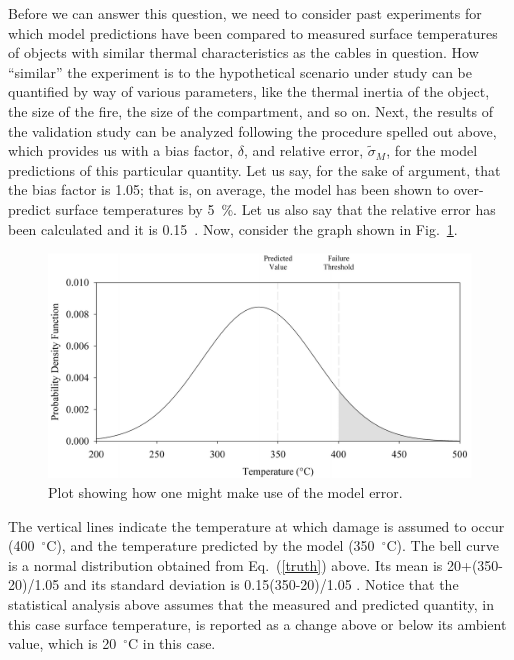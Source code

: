 Before we can answer this question, we need to consider past experiments for which model predictions have been compared to measured surface temperatures of objects
with similar thermal characteristics as the cables in question. How ``similar'' the experiment is to the hypothetical scenario under study can be quantified by way of
various parameters, like the thermal inertia of the object, the size of the fire, the size of the compartment, and so on. Next, the results of the validation study can be
analyzed following the procedure spelled out above, which provides us with a bias factor, $\delta$, and relative error, $\tilde{\sigma}_M$, for the model
predictions of this particular quantity. Let us say, for the sake of argument, that the bias factor is 1.05; that is, on average, the model has been shown to over-predict
surface temperatures by 5~\%. Let us also say that the relative error has been calculated and it is 0.15~.
Now, consider the graph shown in Fig.~\ref{bell_curve}.
\begin{figure}[ht]
\begin{center}
\includegraphics[width=5.in]{FIGURES/bell_curve}
\end{center}
\caption[Demonstration of model error.]{Plot showing how one might make use of the model error.}
\label{bell_curve}
\end{figure}
The vertical lines indicate the temperature at which damage is assumed to occur (400~$^\circ$C), and the temperature predicted by the
model (350~$^\circ$C). The bell curve is a normal distribution obtained from Eq.~(\ref{truth}) above. Its mean is 20+(350-20)/1.05 and its standard deviation
is 0.15(350-20)/1.05 . Notice that the statistical analysis
above assumes that the measured and predicted quantity, in this case surface temperature, is reported as a change above or below its ambient value, which is
20~$^\circ$C in this case.

